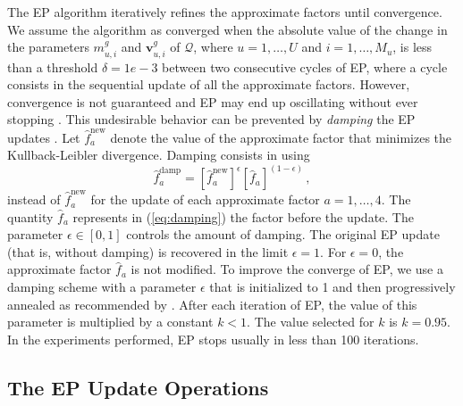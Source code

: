 The EP algorithm iteratively refines the approximate factors until convergence.
We assume the algorithm as converged when the absolute value of the change in the parameters
$m_{u,i}^g$ and $\mathbf{v}_{u,i}^g$ of $\mathcal{Q}$, where $u = 1,\ldots,U$ and $i = 1,\ldots,M_u$,
is less than a threshold $\delta = 1e-3$ between two consecutive cycles of EP,
where a cycle consists in the sequential update of all the approximate factors.
However, convergence is not guaranteed and
EP may end up oscillating without ever stopping \cite{Minka2001}.
This undesirable behavior can be prevented by \emph{damping} the EP updates \cite{Minka2002}.
Let $\hat{f}_a^\text{new}$ denote the value of the approximate factor that minimizes the Kullback-Leibler
divergence. Damping consists in using
\begin{equation}
\hat{f}_a^\text{damp} = \left[ \hat{f}_a^\text{new} \right]^\epsilon \left[ \hat{f}_a \right]^{(1 - \epsilon)}\,,\label{eq:damping}
\end{equation}
instead of $\hat{f}_a^\text{new}$ for the update of each approximate factor $a = 1,\ldots,4$.
The quantity $\hat{f}_a$ represents in (\ref{eq:damping})
the factor before the update. The parameter
$\epsilon \in [0,1]$ controls the amount of damping.
The original EP update (that is, without damping)
is recovered in the limit $\epsilon = 1$. For $\epsilon = 0$,
the approximate factor $\hat{f}_a$ is not modified.
To improve the converge of EP, we use a damping scheme
with a parameter $\epsilon$ that is initialized to 1
and then progressively annealed as recommended by \cite{HernandezLobato2010}.
After each iteration of EP, the value of
this parameter is multiplied by a constant $k < 1$.
The value selected for $k$ is $k = 0.95$.
In the experiments performed, EP stops usually in less than 100 iterations.

\subsection{The EP Update Operations}

